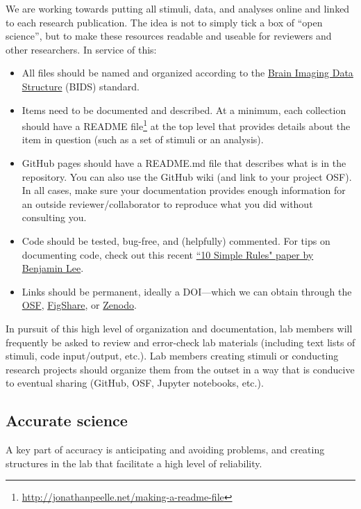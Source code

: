 \documentclass[letterpaper,11pt,oneside]{memoir}
\begin{document}
We are working towards putting all stimuli, data, and analyses online and linked to each research publication. The idea is not to simply tick a box of ``open science'', but to make these resources readable and useable for reviewers and other researchers. In service of this:

\begin{itemize}
\item All files should be named and organized according to the \href{https://bids.neuroimaging.io/}{Brain Imaging Data Structure} (BIDS) standard.
\item Items need to be documented and described. At a minimum, each collection should have a README file\footnote{\url{http://jonathanpeelle.net/making-a-readme-file}} at the top level that provides details about the item in question (such as a set of stimuli or an analysis).
\item GitHub pages should have a README.md file that describes what is in the repository. You can also use the GitHub wiki (and link to your project OSF). In all cases, make sure your documentation provides enough information for an outside reviewer/collaborator to reproduce what you did without consulting you.
\item Code should be tested, bug-free, and (helpfully) commented. For tips on documenting code, check out this recent \href{https://journals.plos.org/ploscompbiol/article?id=10.1371/journal.pcbi.1006561}{``10 Simple Rules" paper by Benjamin Lee}.
\item Links should be permanent, ideally a DOI---which we can obtain through the \href{http://help.osf.io/m/sharing/l/524208-create-dois-and-arks}{OSF}, \href{https://figshare.com/}{FigShare}, or \href{https://zenodo.org/}{Zenodo}.
\end{itemize}

In pursuit of this high level of organization and documentation, lab members will frequently be asked to review and error-check lab materials (including text lists of stimuli, code input/output, etc.). Lab members creating stimuli or conducting research projects should organize them from the outset in a way that is conducive to eventual sharing (GitHub, OSF, Jupyter notebooks, etc.).


\subsection{Accurate science}

A key part of accuracy is anticipating and avoiding problems, and creating structures in the lab that facilitate a high level of reliability.
\end{document}
